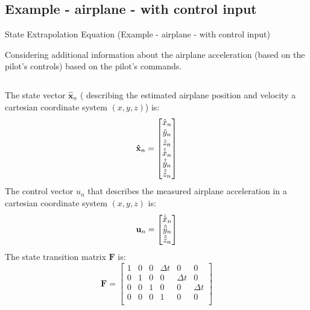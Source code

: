 \subsection{Example - airplane - with control input}
\begin{frame}{State Extrapolation Equation (Example - airplane - with control input)}

Considering additional information about the airplane
acceleration (based on the pilot’s controls) based on the pilot’s commands.

\begin{columns}
        The state vector $\mathbf{\hat{x}}_n$ ( describing the estimated airplane position and velocity a cartesian coordinate system $(x, y, z)$) is:
           \begin{equation*}
            \centering
            \mathbf{\hat{x}}_n =
            \begin{bmatrix}
            \hat{x}_n\\
            \hat{y}_n\\
            \hat{z}_n\\
            \hat{\dot{x}}_n\\
            \hat{\dot{y}}_n\\
            \hat{\dot{z}}_n\\
            \end{bmatrix}
            \end{equation*}
        The control vector $u_n$ that describes the measured airplane acceleration in a cartesian coordinate system $(x, y, z)$ is:
        \begin{equation*}
            \centering
            \mathbf{{u}}_n =
            \begin{bmatrix}
            \hat{\ddot{x}}_n\\
            \hat{\ddot{y}}_n\\
            \hat{\ddot{z}}_n\\
            \end{bmatrix}
        \end{equation*} 
        The state transition matrix $\mathbf{F}$ is:
        $$\mathbf{F} = \begin{bmatrix}
        1 & 0 & 0 & \Delta t & 0 & 0 \\
        0 & 1 & 0 & 0 & \Delta t & 0 \\
        0 & 0 & 1 & 0 & 0 & \Delta t\\
        0 & 0 & 0 & 1 & 0 & 0 \\

\end{bmatrix}$$
\end{columns}
\end{frame}
